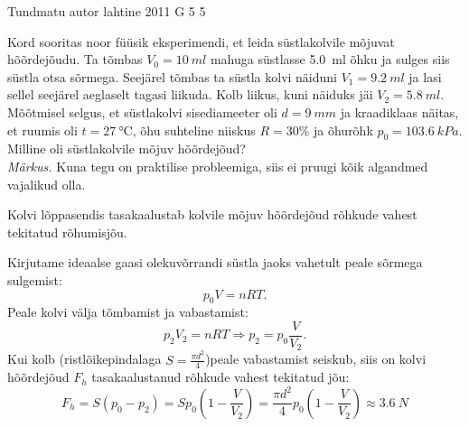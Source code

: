 {Tundmatu autor} %
{lahtine} %
{2011} %
{G 5} %
{5} %
{
\ifStatement
Kord sooritas noor füüsik eksperimendi, et leida süstlakolvile mõjuvat
hõõrdejõudu. Ta tõmbas $V_{0}=\SI{10}{ml}$ mahuga süstlasse \SI{5,0}{ml} õhku ja sulges siis
süstla otsa sõrmega. Seejärel tõmbas ta süstla kolvi näiduni
$V_{1}=\SI{9,2}{ml}$ ja
lasi sellel seejärel aeglaselt tagasi liikuda. Kolb liikus, kuni näiduks jäi $V_{2}=\SI{5,8}{ml}$.
Mõõtmisel selgus, et süstlakolvi sisediameeter oli $d=\SI{9}{mm}$ ja kraadiklaas
näitas, et ruumis oli $t=\SI{27}{\celsius}$, õhu suhteline niiskus $R=30\%$ ja õhurõhk
$p_{0}=\SI{103,6}{kPa}$. Milline oli süstlakolvile mõjuv hõõrdejõud?\\
\textit{Märkus.} Kuna tegu on praktilise probleemiga, siis ei pruugi kõik
algandmed vajalikud olla.
\fi


\ifHint
Kolvi lõppasendis tasakaalustab kolvile mõjuv hõõrdejõud rõhkude vahest tekitatud rõhumisjõu.
\fi


\ifSolution
Kirjutame ideaalse gaasi olekuvõrrandi süstla jaoks vahetult peale sõrmega sulgemist:
\[p_{0}V=nRT.\]
Peale kolvi välja tõmbamist ja vabastamist:
\[p_{2}V_{2}=nRT \Rightarrow p_{2}=p_{0}\frac{V}{V_{2}}. \]
Kui kolb (ristlõikepindalaga $S=\frac{\pi d^{2}}{4}$)peale vabastamist seiskub, siis on kolvi hõõrdejõud $F_{h}$ tasakaalustanud rõhkude vahest tekitatud jõu:
\[F_{h}=S(p_{0}-p_{2})=Sp_{0} \left(1-\frac{V}{V_{2}}\right)=\frac{\pi
	d^{2}}{4}p_{0} \left(1-\frac{V}{V_{2}}\right) \approx \SI{3,6}{N} \]
\fi
}